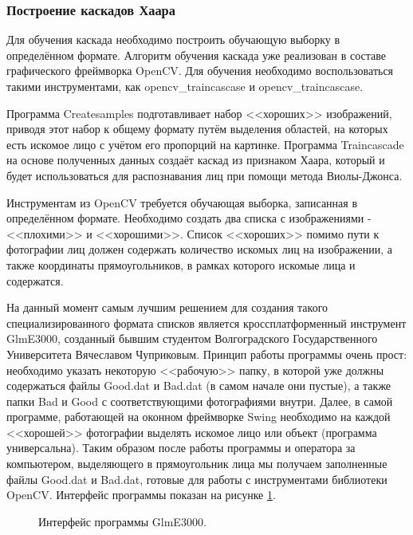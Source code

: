 \documentclass[12pt,a4paper]{scrartcl}
\begin{document}
		\subsubsection{Построение каскадов Хаара}
		
			Для обучения каскада необходимо построить обучающую выборку в определённом формате. Алгоритм обучения каскада уже реализован в составе графического фреймворка OpenCV. Для обучения необходимо воспользоваться такими инструментами, как opencv\_traincascase и opencv\_traincascase. 
			
			Программа Createsamples подготавливает набор <<хороших>> изображений, приводя этот набор к общему формату путём выделения областей, на которых есть искомое лицо с учётом его пропорций на картинке. Программа Traincascade на основе полученных данных создаёт каскад из признаком Хаара, который и будет использоваться для распознавания лиц при помощи метода Виолы-Джонса.
			
			Инструментам из OpenCV требуется обучающая выборка, записанная в определённом формате. Необходимо создать два списка с изображениями - <<плохими>> и <<хорошими>>. Список <<хороших>> помимо пути к фотографии лиц должен содержать количество искомых лиц на изображении, а также координаты прямоугольников, в рамках которого искомые лица и содержатся\cite{bib:Chuprikov_NIR}.
			
			На данный момент самым лучшим решением для создания такого специализированного формата списков является кроссплатформенный инструмент GlmE3000, созданный бывшим студентом Волгоградского Государственного Университета Вячеславом Чуприковым. Принцип работы программы очень прост: необходимо указать некоторую <<рабочую>> папку, в которой уже должны содержаться файлы Good.dat и Bad.dat (в самом начале они пустые), а также папки Bad и Good с соответствующими фотографиями внутри. Далее, в самой программе, работающей на оконном фреймворке Swing необходимо на каждой <<хорошей>> фотографии выделять искомое лицо или объект (программа универсальна). Таким образом после работы программы и оператора за компьютером, выделяющего в прямоугольник лица мы получаем заполненные файлы Good.dat и Bad.dat, готовые для работы с инструментами библиотеки OpenCV. Интерфейс программы показан на рисунке \ref{fig:Glme_3000}.
			
			\begin{figure}[h]
				\caption{Интерфейс программы GlmE3000.}
				\label{fig:Glme_3000}
			\end{figure}
		
\end{document}
